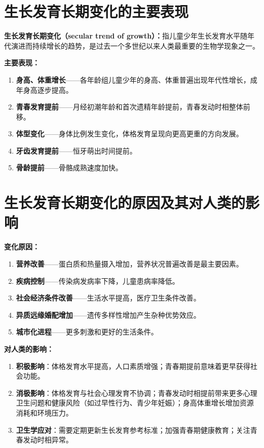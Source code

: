 \section{生长发育长期变化的主要表现}

\begin{keybox}
\textbf{生长发育长期变化（secular trend of growth）：}指儿童少年生长发育水平随年代演进而持续增长的趋势，是过去一个多世纪以来人类最重要的生物学现象之一。

\textbf{主要表现：}

\begin{enumerate}[leftmargin=*]
    \item \textbf{身高、体重增长}——各年龄组儿童少年的身高、体重普遍出现年代性增长，成年身高逐步提高。
    \item \textbf{青春发育提前}——月经初潮年龄和首次遗精年龄提前，青春发动时相整体前移。
    \item \textbf{体型变化}——身体比例发生变化，体格发育呈现向更高更重的方向发展。
    \item \textbf{牙齿发育提前}——恒牙萌出时间提前。
    \item \textbf{骨龄提前}——骨骼成熟速度加快。
\end{enumerate}
\end{keybox}

\section{生长发育长期变化的原因及其对人类的影响}

\begin{tipbox}
\textbf{变化原因：}

\begin{enumerate}[leftmargin=*]
    \item \textbf{营养改善}——蛋白质和热量摄入增加，营养状况普遍改善是最主要因素。
    \item \textbf{疾病控制}——传染病发病率下降，儿童患病率降低。
    \item \textbf{社会经济条件改善}——生活水平提高，医疗卫生条件改善。
    \item \textbf{异质远缘婚配增加}——遗传多样性增加产生杂种优势效应。
    \item \textbf{城市化进程}——更多刺激和更好的生活条件。
\end{enumerate}

\textbf{对人类的影响：}

\begin{enumerate}[leftmargin=*]
    \item \textbf{积极影响}：体格发育水平提高，人口素质增强；青春期提前意味着更早获得社会功能。
    \item \textbf{消极影响}：体格发育与社会心理发育不协调；青春发动时相提前带来更多心理卫生问题和健康风险（如过早性行为、青少年妊娠）；身高体重增长增加资源消耗和环境压力。
    \item \textbf{卫生学应对}：需要定期更新生长发育参考标准；加强青春期健康教育；关注青春发动时相异常。
\end{enumerate}
\end{tipbox}

